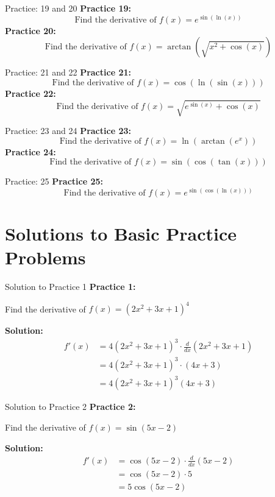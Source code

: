 \documentclass[aspectratio=169]{beamer}
\begin{document}
\begin{frame}{Practice: 19 and 20}
\textbf{Practice 19:}
\[
\text{Find the derivative of } f(x) = e^{\sin(\ln(x))}
\]
\vspace{1em}
\textbf{Practice 20:}
\[
\text{Find the derivative of } f(x) = \arctan(\sqrt{x^2 + \cos(x)})
\]
\end{frame}

\begin{frame}{Practice: 21 and 22}
\textbf{Practice 21:}
\[
\text{Find the derivative of } f(x) = \cos(\ln(\sin(x)))
\]
\vspace{1em}
\textbf{Practice 22:}
\[
\text{Find the derivative of } f(x) = \sqrt{e^{\sin(x)} + \cos(x)}
\]
\end{frame}

\begin{frame}{Practice: 23 and 24}
\textbf{Practice 23:}
\[
\text{Find the derivative of } f(x) = \ln(\arctan(e^x))
\]
\vspace{1em}
\textbf{Practice 24:}
\[
\text{Find the derivative of } f(x) = \sin(\cos(\tan(x)))
\]
\end{frame}

\begin{frame}{Practice: 25}
\textbf{Practice 25:}
\[
\text{Find the derivative of } f(x) = e^{\sin(\cos(\ln(x)))}
\]
\end{frame}

\section{Solutions to Basic Practice Problems}

\begin{frame}{Solution to Practice 1}
\textbf{Practice 1:}

Find the derivative of $f(x) = (2x^2 + 3x + 1)^4$

\textbf{Solution:}
\[
\begin{aligned}
  f'(x) &= 4(2x^2 + 3x + 1)^3 \cdot \frac{d}{dx}(2x^2 + 3x + 1) \\
  &= 4(2x^2 + 3x + 1)^3 \cdot (4x + 3) \\
  &= 4(2x^2 + 3x + 1)^3(4x + 3)
\end{aligned}
\]
\end{frame}

\begin{frame}{Solution to Practice 2}
\textbf{Practice 2:}

Find the derivative of $f(x) = \sin(5x - 2)$

\textbf{Solution:}
\[
\begin{aligned}
  f'(x) &= \cos(5x - 2) \cdot \frac{d}{dx}(5x - 2) \\
  &= \cos(5x - 2) \cdot 5 \\
  &= 5\cos(5x - 2)
\end{aligned}
\]
\end{frame}
\end{document}
